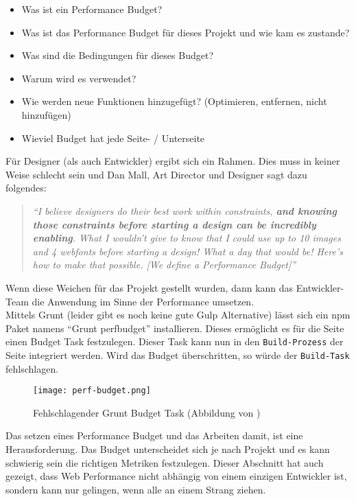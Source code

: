 			\begin{itemize}
				\item Was ist ein Performance Budget?
				\item Was ist das Performance Budget für dieses Projekt und wie kam es zustande?
				\item Was sind die Bedingungen für dieses Budget?
				\item Warum wird es verwendet?
				\item Wie werden neue Funktionen hinzugefügt? (Optimieren, entfernen, nicht hinzufügen)
				\item Wieviel Budget hat jede Seite- / Unterseite
			\end{itemize}

			Für Designer (als auch Entwickler) ergibt sich ein Rahmen. Dies muss in keiner Weise schlecht sein und Dan Mall, Art Director und Designer sagt dazu folgendes:

			\begin{quote}
				\textit{"`I believe designers do their best work within constraints, \textbf{and knowing those constraints before starting a design can be incredibly enabling}. What I wouldn’t give to know that I could use up to 10 images and 4 webfonts before starting a design! What a day that would be! Here’s how to make that possible. [We define a Performance Budget]"'}\autocite{mall14}
			\end{quote}

			Wenn diese Weichen für das Projekt gestellt wurden, dann kann das Entwickler-Team die Anwendung im Sinne der Performance umsetzen.\\
			Mittels Grunt (leider gibt es noch keine gute Gulp Alternative) lässt sich ein npm Paket namens "`Grunt perfbudget"' installieren. Dieses ermöglicht es für die Seite einen Budget Task festzulegen. Dieser Task kann nun in den \texttt{Build-Prozess} der Seite integriert werden. Wird das Budget überschritten, so würde der \texttt{Build-Task} fehlschlagen.

			\begin{figure}[htbp]
				\begin{center}
					\texttt{[image: perf-budget.png]}
					\caption{Fehlschlagender Grunt Budget Task (Abbildung von \autocite{farman14})}
					\label{fig:perf-budget}
				\end{center}
			\end{figure}
		
		Das setzen eines Performance Budget und das Arbeiten damit, ist eine Herausforderung. Das Budget unterscheidet sich je nach Projekt und es kann schwierig sein die richtigen Metriken festzulegen. Dieser Abschnitt hat auch gezeigt, dass Web Performance nicht abhängig von einem einzigen Entwickler ist, sondern kann nur gelingen, wenn alle an einem Strang ziehen.	


\pagebreak
%
%
